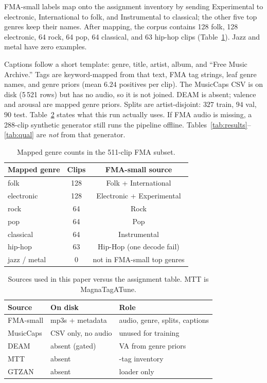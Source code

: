 \documentclass[conference]{IEEEtran}
\begin{document}
FMA-small labels map onto the assignment inventory by sending Experimental to electronic, International to folk, and Instrumental to classical; the other five top genres keep their names. After mapping, the corpus contains 128 folk, 128 electronic, 64 rock, 64 pop, 64 classical, and 63 hip-hop clips (Table~\ref{tab:genre}). Jazz and metal have zero examples.

Captions follow a short template: genre, title, artist, album, and ``Free Music Archive.'' Tags are keyword-mapped from that text, FMA tag strings, leaf genre names, and genre priors (mean $6.24$ positives per clip). The MusicCaps CSV is on disk (5\,521 rows) but has no audio, so it is not joined. DEAM is absent; valence and arousal are mapped genre priors. Splits are artist-disjoint: $327$ train, $94$ val, $90$ test. Table~\ref{tab:data} states what this run actually uses. If FMA audio is missing, a 288-clip synthetic generator still runs the pipeline offline. Tables~\ref{tab:results}--\ref{tab:qual} are \emph{not} from that generator.

\begin{table}[t]
\caption{Mapped genre counts in the 511-clip FMA subset.}
\label{tab:genre}
\centering
\setlength{\tabcolsep}{4pt}
\begin{tabular}{@{}lcc@{}}
\toprule
Mapped genre & Clips & FMA-small source \\
\midrule
folk & 128 & Folk + International \\
electronic & 128 & Electronic + Experimental \\
rock & 64 & Rock \\
pop & 64 & Pop \\
classical & 64 & Instrumental \\
hip-hop & 63 & Hip-Hop (one decode fail) \\
jazz / metal & 0 & not in FMA-small top genres \\
\bottomrule
\end{tabular}
\end{table}

\begin{table}[t]
\caption{Sources used in this paper versus the assignment table. MTT is MagnaTagATune.}
\label{tab:data}
\centering
\renewcommand{\arraystretch}{1.18}
\setlength{\tabcolsep}{3pt}
\begin{tabularx}{\columnwidth}{@{}>{\raggedright\arraybackslash}p{2.15cm}>{\raggedright\arraybackslash}X>{\raggedright\arraybackslash}X@{}}
\toprule
Source & On disk & Role \\
\midrule
FMA-small & 511 mp3s + metadata & audio, genre, splits, captions \\
MusicCaps & CSV only, no audio & unused for training \\
DEAM & absent (gated) & VA from genre priors \\
MTT & absent & 24-tag inventory \\
GTZAN & absent & loader only \\
\bottomrule
\end{tabularx}
\end{table}
\end{document}
